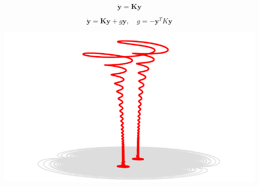 \begin{equation*}
  \dot{\mathbf{y}} = \mathbf{K} \mathbf{y}
\end{equation*}

\begin{equation*}
  \dot{\mathbf{y}} = \mathbf{K} \mathbf{y} + g \mathbf{y}, \quad g = - \mathbf{y}^T K \mathbf{y}
\end{equation*}

\eframe

\begin{center}
  \includegraphics[width=\textwidth]{i/far.pdf}
\end{center}
\eframe

